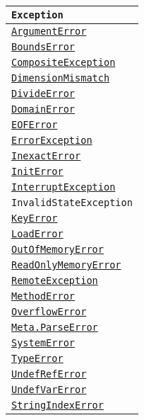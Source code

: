 \begin{table}[h]

\begin{tabulary}{\linewidth}{|L|}
\hline
\texttt{Exception} \\
\hline
\hyperlink{9721838137887538764}{\texttt{ArgumentError}} \\
\hline
\hyperlink{9731558909100893938}{\texttt{BoundsError}} \\
\hline
\hyperlink{15047752250898038281}{\texttt{CompositeException}} \\
\hline
\hyperlink{13752533629496758140}{\texttt{DimensionMismatch}} \\
\hline
\hyperlink{4168463413201806292}{\texttt{DivideError}} \\
\hline
\hyperlink{14085880504701688639}{\texttt{DomainError}} \\
\hline
\hyperlink{2683611566077490148}{\texttt{EOFError}} \\
\hline
\hyperlink{12102596058483452470}{\texttt{ErrorException}} \\
\hline
\hyperlink{5399118524830636312}{\texttt{InexactError}} \\
\hline
\hyperlink{15248096136337910028}{\texttt{InitError}} \\
\hline
\hyperlink{11255134339055983338}{\texttt{InterruptException}} \\
\hline
\texttt{InvalidStateException} \\
\hline
\hyperlink{12862287453053981792}{\texttt{KeyError}} \\
\hline
\hyperlink{15548397364092946520}{\texttt{LoadError}} \\
\hline
\hyperlink{9656432107553099418}{\texttt{OutOfMemoryError}} \\
\hline
\hyperlink{5617183776424836760}{\texttt{ReadOnlyMemoryError}} \\
\hline
\hyperlink{10250718604436154991}{\texttt{RemoteException}} \\
\hline
\hyperlink{68769522931907606}{\texttt{MethodError}} \\
\hline
\hyperlink{10461069697702909970}{\texttt{OverflowError}} \\
\hline
\hyperlink{6896679243086513948}{\texttt{Meta.ParseError}} \\
\hline
\hyperlink{16303515589950241655}{\texttt{SystemError}} \\
\hline
\hyperlink{2622693721821893139}{\texttt{TypeError}} \\
\hline
\hyperlink{7764749529861419421}{\texttt{UndefRefError}} \\
\hline
\hyperlink{4452889246677411554}{\texttt{UndefVarError}} \\
\hline
\hyperlink{414193743931514144}{\texttt{StringIndexError}} \\
\hline
\end{tabulary}

\end{table}



